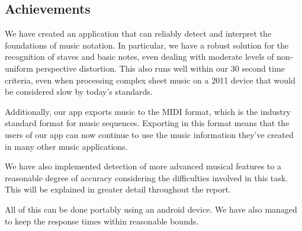 \subsection{Achievements}
We have created an application that can reliably detect and interpret the foundations of music notation. In  particular, we have a robust solution for the recognition of staves and basic notes, even dealing with moderate levels of non-uniform perspective distortion. This also runs well within our 30 second time criteria, even when processing complex sheet music on a 2011 device that would be considered slow by today's standards.

Additionally, our app exports music to the MIDI format, which is the industry standard format for music sequences. Exporting in this format means that the users of our app can now continue to use the music information they've created in many other music applications.

We have also implemented detection of more advanced musical features to a reasonable degree of accuracy considering the difficulties involved in this task. This will be explained in greater detail throughout the report.

All of this can be done portably using an android device. We have also managed to keep the response times within reasonable bounds.
